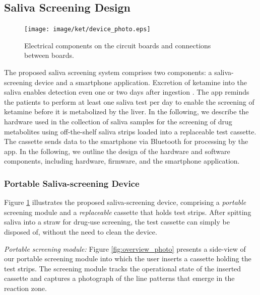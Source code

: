 \subsection{Saliva Screening Design}
\label{sec:design_of_saliva_screening}


\begin{figure}[ht]
\begin{center}
\texttt{[image: image/ket/device\_photo.eps]}
\caption{Electrical components on the circuit boards and connections between boards.}
\label{fig:device_photo}
\end{center}
\end{figure}

The proposed saliva screening system comprises two components: a saliva-screening device and a smartphone application. Excretion of ketamine into the saliva enables detection even one or two days after ingestion \cite{saliva_test_cassette}. The app reminds the patients to perform at least one saliva test per day to enable the screening of ketamine before it is metabolized by the liver. In the following, we describe the hardware used in the collection of saliva samples for the screening of drug metabolites using off-the-shelf saliva strips \cite{saliva_test_cassette} loaded into a replaceable test cassette. The cassette sends data to the smartphone via Bluetooth for processing by the app. In the following, we outline the design of the hardware and software components, including  hardware, firmware, and the smartphone application.


\subsubsection{Portable Saliva-screening Device}
Figure \ref{fig:device_photo} illustrates the proposed saliva-screening device, comprising a \emph{portable} screening module and a \emph{replaceable} cassette that holds test strips. After spitting saliva into a straw for drug-use screening, the test cassette can simply be disposed of, without the need to clean the device.

\textit{Portable screening module:}
\newline
Figure \ref{fig:overview_photo} presents a side-view of our portable screening module into which the user inserts a cassette holding the test strips. The screening module tracks the operational state of the inserted cassette and captures a photograph of the line patterns that emerge in the reaction zone.

